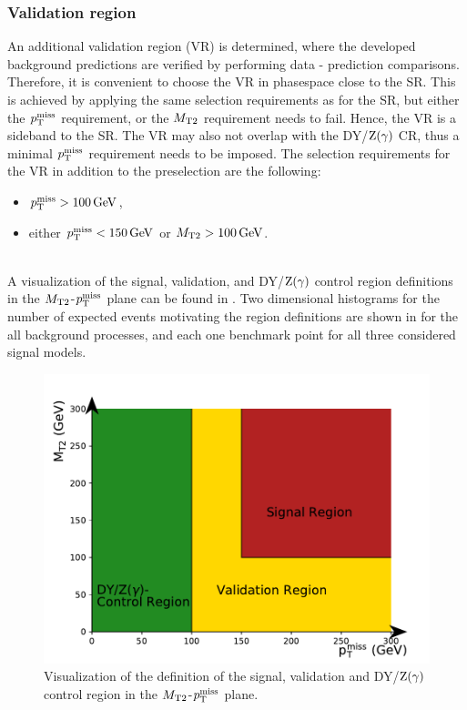 \subsubsection{Validation region}
An additional validation region (VR) is determined, where the developed background predictions are verified by performing data - prediction comparisons. Therefore, it is convenient to choose the VR in phasespace close to the SR. This is achieved by applying the same selection requirements as for the SR, but either the $p_{\mathrm{T}}^\text{miss}$ requirement, or the $M_{\mathrm{T2}}$ requirement needs to fail. Hence, the VR is a sideband to the SR. The VR may also not overlap with the DY/$\mathrm{Z}(\gamma)$ CR, thus a minimal $p_{\mathrm{T}}^\text{miss}$ requirement needs to be imposed. The selection requirements for the VR in addition to the preselection are the following:
\begin{itemize}
 \item $p_{\mathrm{T}}^\text{miss}>100\,\text{Ge\hspace{-.08em}V}$,
 \item either $p_{\mathrm{T}}^\text{miss}<150\,\text{Ge\hspace{-.08em}V}$ or $M_{\mathrm{T2}}>100\,\text{Ge\hspace{-.08em}V}$.
\end{itemize}
\\
A visualization of the signal, validation, and DY/$\mathrm{Z}(\gamma)$ control region definitions in the $M_{\mathrm{T2}}$-$p_{\mathrm{T}}^\text{miss}$ plane can be found in . Two dimensional histograms for the number of expected events motivating the region definitions are shown in  for the all background processes, and each one benchmark point for all three considered signal models.
\begin{figure}[htb]
 \centering
 \includegraphics[width=\pairwidth]{figures/figures/regions}
 \caption{Visualization of the definition of the signal, validation and DY/$\mathrm{Z}(\gamma)$ control region in the $M_{\mathrm{T2}}$-$p_{\mathrm{T}}^\text{miss}$ plane.}
 \label{fig:Regions}
\end{figure}

